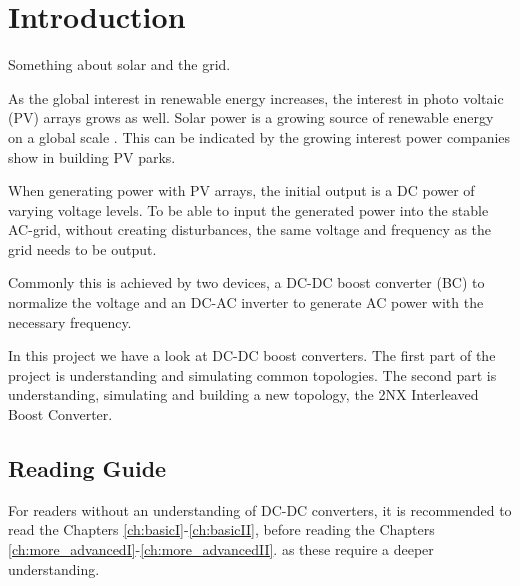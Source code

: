\chapter{Introduction}\label{ch:introduction}
Something about solar and the grid.

As the global interest in renewable energy increases,
the interest in photo voltaic (PV) arrays grows as well. 
Solar power is a growing source of renewable energy on a global scale \cite{solglob}. 
This can be indicated by the growing interest power companies show in building PV parks. 

When generating power with PV arrays,
the initial output is a DC power of varying voltage levels. 
To be able to input the generated power into the stable AC-grid,
without creating disturbances,
the same voltage and frequency as the grid needs to be output. 

Commonly this is achieved by two devices,
a DC-DC boost converter (BC) to normalize the voltage
and an DC-AC inverter to generate AC power with the necessary frequency.

In this project we have a look at DC-DC boost converters.
The first part of the project is understanding and simulating common topologies.
The second part is understanding, simulating and building a new topology,
the 2NX Interleaved Boost Converter. 


\section*{Reading Guide}
For readers without an understanding of DC-DC converters,
it is recommended to read the Chapters \ref{ch:basicI}-\ref{ch:basicII}, 
before reading the Chapters \ref{ch:more_advancedI}-\ref{ch:more_advancedII}. 
as these require a deeper understanding.